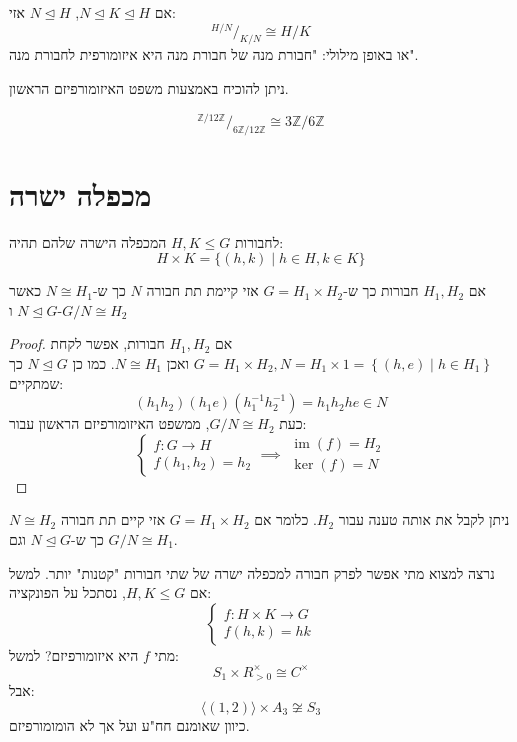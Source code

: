\documentclass{tstextbook}
\begin{document}
\begin{theorem}
אם \(N\trianglelefteq K\trianglelefteq H\), \(N\trianglelefteq H\) אזי:
$$^{H / N }/ _{ K  / N } \cong H/K$$
או באופן מילולי: "חבורת מנה של חבורת מנה היא איזומורפית לחבורת מנה".

\end{theorem}
ניתן להוכיח באמצעות משפט האיזומורפיזם הראשון.

\begin{example}
$$^{\mathbb{Z} / 12 \mathbb{Z} }
/ _{ 6\mathbb{Z}  / 12 \mathbb{Z} } \cong 3 \mathbb{Z}  / 6\mathbb{Z}$$

\end{example}

\section{מכפלה ישרה}

\begin{definition}
לחבורות \(H,K\leq G\) המכפלה הישרה שלהם תהיה:
$$ H\times K=\{(h,k)\mid h\in H,k\in K\}$$

\end{definition}
\begin{proposition}
אם \(H_{1}, H_{2}\) חבורות כך ש-\(G=H_{1}\times H_{2}\) אזי קיימת תת חבורה \(N\) כך ש-\(N\cong H_{1}\) כאשר \(N\trianglelefteq G\) ו-\(G / N \cong H_{2}\)

\end{proposition}
\begin{proof}
אם \(H_{1}, H_{2}\) חבורות, אפשר לקחת \(G=H_{1}\times H_{2}, N=H_{1}\times 1=\left\{  (h,e)\mid h\in H_{1}  \right\}\) ואכן \(N\cong H_{1}\). כמו כן \(N\trianglelefteq G\) כך שמתקיים:
$$(h_{1}h_{2})(h_{1}e)(h_{1}^{-1} h_{2}^{-1} )=h_{1}h_{2}he\in N$$
כעת \(G / N \cong H_{2}\), ממשפט האיזומורפיזם הראשון עבור: 
$$\begin{cases}f:G\to H \\f(h_{1},h_{2})=h_{2}\end{cases}\implies \begin{array}{c }\operatorname{im}(f)=H_{2} \\\ker(f)=N 
\end{array}$$

\end{proof}
\begin{corollary}
ניתן לקבל את אותה טענה עבור \(H_{2}\). כלומר אם \(G=H_{1}\times H_{2}\) אזי קיים תת חבורה \(N\cong H_{2}\) כך ש-\(N\trianglelefteq G\) וגם \(G / N \cong H_{1}\).

\end{corollary}
נרצה למצוא מתי אפשר לפרק חבורה למכפלה ישרה של שתי חבורות "קטנות" יותר. למשל אם \(H,K\leq G\), נסתכל על הפונקציה: 
$$\begin{cases}f:H\times K\to G \\f(h,k)=hk
\end{cases}$$
מתי \(f\) היא איזומורפיזם? למשל:
$$S_{1}\times R^{\times}_{>0}\cong C^{\times}$$
אבל:
$$\langle (1,2) \rangle \times A_{3}\not\cong  S_{3}$$
כיוון שאומנם חח"ע ועל אך לא הומומורפיזם.
\end{document}

